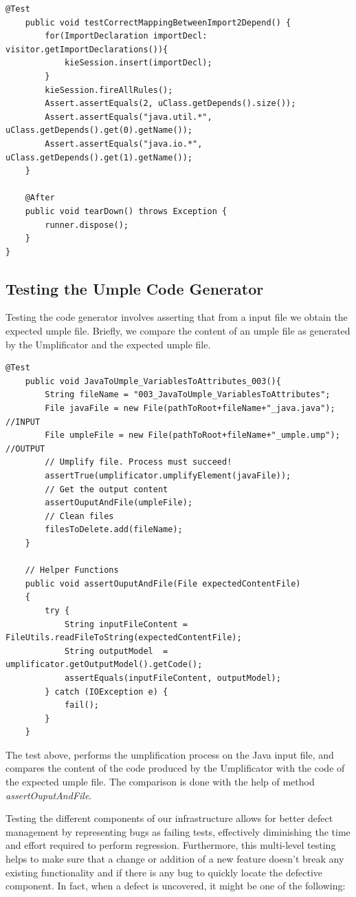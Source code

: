 \begin{lstlisting}[style=java]
	@Test
	public void testCorrectMappingBetweenImport2Depend() {
		for(ImportDeclaration importDecl: visitor.getImportDeclarations()){
			kieSession.insert(importDecl);
		}
		kieSession.fireAllRules();
		Assert.assertEquals(2, uClass.getDepends().size());
		Assert.assertEquals("java.util.*", uClass.getDepends().get(0).getName());
		Assert.assertEquals("java.io.*", uClass.getDepends().get(1).getName());
	}
	
	@After
	public void tearDown() throws Exception {
		runner.dispose();		
	}
}
\end{lstlisting}

\subsection{Testing the Umple Code Generator}

Testing the code generator involves asserting that from a input file we obtain the expected umple file. Briefly, we
compare the content of an umple file as generated by the Umplificator and the expected umple file. 

\begin{lstlisting}[style=java]
	@Test
	public void JavaToUmple_VariablesToAttributes_003(){
		String fileName = "003_JavaToUmple_VariablesToAttributes";
		File javaFile = new File(pathToRoot+fileName+"_java.java"); //INPUT
		File umpleFile = new File(pathToRoot+fileName+"_umple.ump"); //OUTPUT
		// Umplify file. Process must succeed!
		assertTrue(umplificator.umplifyElement(javaFile));
		// Get the output content
		assertOuputAndFile(umpleFile);
		// Clean files 
		filesToDelete.add(fileName);
	}
	
	// Helper Functions
	public void assertOuputAndFile(File expectedContentFile)
	{
		try {
			String inputFileContent = FileUtils.readFileToString(expectedContentFile);
			String outputModel  = umplificator.getOutputModel().getCode();
			assertEquals(inputFileContent, outputModel);
		} catch (IOException e) {
			fail();
		}
	}
\end{lstlisting}

The test above, performs the umplification process on the Java input file, and compares the content of the code produced by the Umplificator with the code of the expected umple file. The comparison is done with the help of method \textit{assertOuputAndFile}.

Testing the different components of our infrastructure allows for better defect management by representing bugs as failing tests, effectively diminishing the time and effort required to perform regression. Furthermore, this multi-level testing helps to make sure that a change or addition of a new feature doesn't break any existing functionality and if there is any bug to quickly locate the defective component. In fact, when a defect is uncovered, it might be one of the following:

